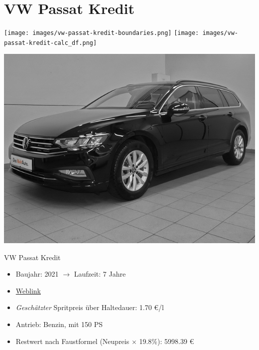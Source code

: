 \documentclass[landscape, DIV=99, 14pt]{scrartcl}
\begin{document}
\pagebreak


\twocolumn

\section*{VW Passat Kredit}
\begin{center}
\texttt{[image: images/vw-passat-kredit-boundaries.png]}
\null
\vspace{0.5cm}
\texttt{[image: images/vw-passat-kredit-calc\_df.png]}
\end{center}

\pagebreak
\null
\vspace{2cm}
\begin{center}
\includegraphics[width=0.9\columnwidth]{cars/vw-passat.jpg}

VW Passat Kredit
\end{center}

\begin{itemize}
    \item Baujahr: 2021 $\rightarrow$ Laufzeit: 7 Jahre
    \item \href{https://www.autosuche.de/auto/REVVNDQ3NjgwMjc5NzI=?t_manuf=BQ&t_petr=B&t_model=BQBM&t_gear=A&t_ez_fr=2020&t_pe_fr=35000&sort=PRICE_SALE&sortdirection=ASC&viewMode=tile}{Weblink}
    \item \emph{Gesch\"atzter} Spritpreis \"uber Haltedauer: 1.70 \euro{}/l
    \item Antrieb: Benzin, mit 150 PS
    \item Restwert nach Faustformel (Neupreis $\times$ 19.8\%): 5998.39 \euro{}
\end{itemize}

\pagebreak
\end{document}
